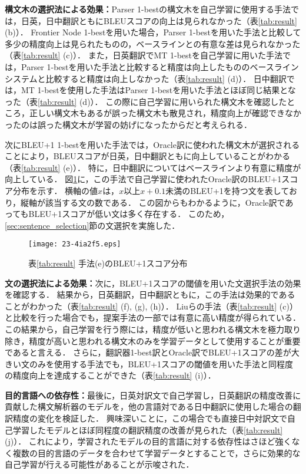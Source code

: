 \documentclass[japanese]{jnlp_1.4}
\begin{document}
\textbf{構文木の選択法による効果：}Parser 1-bestの構文木を自己学習に使用する手法では，日英，日中翻訳ともにBLEUスコアの向上は見られなかった（表\ref{tab:result} (b)）．
Frontier Node 1-bestを用いた場合，Parser 1-bestを用いた手法と比較して多少の精度向上は見られたものの，ベースラインとの有意な差は見られなかった（表\ref{tab:result} (c)）．
また，日英翻訳でMT 1-bestを自己学習に用いた手法では，Parser 1-bestを用いた手法と比較すると精度は向上したもののベースラインシステムと比較すると精度は向上しなかった（表\ref{tab:result} (d)）．
日中翻訳では，MT 1-bestを使用した手法はParser 1-bestを用いた手法とほぼ同じ結果となった（表\ref{tab:result} (d)）．
この際に自己学習に用いられた構文木を確認したところ，正しい構文木もあるが誤った構文木も散見され，精度向上が確認できなかったのは誤った構文木が学習の妨げになったからだと考えられる．

次にBLEU+1 1-bestを用いた手法では，Oracle訳に使われた構文木が選択されることにより，BLEUスコアが日英，日中翻訳ともに向上していることがわかる（表\ref{tab:result} (e)）．
特に，日中翻訳についてはベースラインより有意に精度が向上している．
図\ref{fig:oracle_bleu}に，この手法で自己学習に使われたOracle訳のBLEU+1スコア分布を示す．
横軸の値$x$は，$x$以上$x+0.1$未満のBLEU+1を持つ文を表しており，縦軸が該当する文の数である．
この図からもわかるように，Oracle訳であってもBLEU+1スコアが低い文は多く存在する．
このため，\ref{sec:sentence_selection}節の文選択を実施した．

\begin{figure}[b]
\begin{center}
\texttt{[image: 23-4ia2f5.eps]}
\end{center}
\caption{表\ref{tab:result} 手法(e)のBLEU+1スコア分布}
\label{fig:oracle_bleu}
\end{figure}

\textbf{文の選択法による効果：}次に，BLEU+1スコアの閾値を用いた文選択手法の効果を確認する．
結果から，日英翻訳，日中翻訳ともに，この手法は効果的であることがわかった（表\ref{tab:result} (f), (g), (h)）．
Liuらの手法（表\ref{tab:result} (c)）と比較を行った場合でも，提案手法の一部では有意に高い精度が得られている．
この結果から，自己学習を行う際には，精度が低いと思われる構文木を極力取り除き，精度が高いと思われる構文木のみを学習データとして使用することが重要であると言える．
さらに，翻訳器1-best訳とOracle訳でBLEU+1スコアの差が大きい文のみを使用する手法でも，BLEU+1スコアの閾値を用いた手法と同程度の精度向上を達成することができた（表\ref{tab:result} (i)）．

\textbf{目的言語への依存性：}最後に，日英対訳文で自己学習し，日英翻訳の精度改善に貢献した構文解析器のモデルを，他の言語対である日中翻訳に使用した場合の翻訳精度の変化を検証した．
興味深いことに，この場合でも直接日中対訳文で自己学習したモデルとほぼ同程度の翻訳精度の改善が見られた（表\ref{tab:result} (j)）．
これにより，学習されたモデルの目的言語に対する依存性はさほど強くなく複数の目的言語のデータを合わせて学習データとすることで，さらに効果的な自己学習が行える可能性があることが示唆された．
\end{document}
